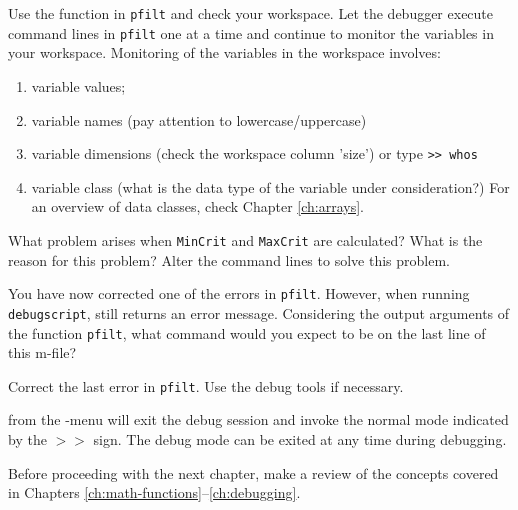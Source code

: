 \begin{action}
Use the  function in {\tt pfilt} and check your workspace. Let the debugger execute command lines in {\tt pfilt} one at a time and continue to monitor the variables in your workspace. Monitoring of the variables in the workspace involves:
\begin{enumerate}
\item variable values;
\item variable names (pay attention to lowercase/uppercase)
\item variable dimensions (check the workspace column 'size') or type {\tt >> whos}
\item variable class (what is the data type of the variable under consideration?) For an overview of data classes, check Chapter \ref{ch:arrays}.
\end{enumerate}
\end{action}

\begin{action}
What problem arises when {\tt MinCrit} and {\tt MaxCrit} are calculated? What is the reason for this problem? Alter the command lines to solve this problem.
\end{action}

\noindent You have now corrected one of the errors in {\tt pfilt}. However, when running {\tt debugscript}, \MATLAB{} still returns an error message. Considering the output arguments of the function {\tt pfilt}, what command would you expect to be on the last line of this m-file?

\begin{action}
Correct the last error in {\tt pfilt}. Use the debug tools if necessary.
\end{action}


\noindent {} from the -menu will exit the debug session and invoke the normal mode indicated by the $>>$ sign. The debug mode can be exited at any time during debugging.



\noindent Before proceeding with the next chapter, make a review of the concepts covered in Chapters \ref{ch:math-functions}--\ref{ch:debugging}.


